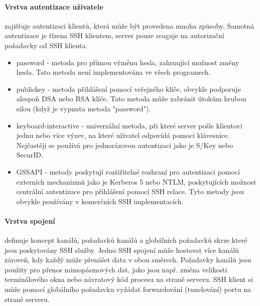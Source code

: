 \documentclass[10pt,a4paper]{article}
\begin{document}
\paragraph{Vrstva autentizace uživatele} zajišťuje autentizaci klientů, která může být provedena mnoha způsoby. Samotná autentizace je řízena SSH klientem, server pouze reaguje na autorizační požadavky od SSH klienta.
\begin{itemize}
	\item password - metoda pro přímou výměnu hesla, zahrnující možnost změny hesla. Tato metoda není implementována ve všech programech.
	\item publickey - metoda přihlášení pomocí veřejného klíče, obvykle podporuje alespoň DSA nebo RSA klíče. Tato metoda může zabránit útokům hrubou silou (když je vypnuta metoda "password").
	\item keyboard-interactive - univerzální metoda, při které server pošle klientovi jednu nebo více výzev, na které uživatel odpovídá pomocí klávesnice. Nejčastěji se používá pro jednorázovou autentizaci jako je S/Key nebo SecurID.
	\item GSSAPI - metody poskytují rozšiřitelné rozhraní pro autentizaci pomocí externích mechanizmů jako je Kerberos 5 nebo NTLM, poskytujících možnost centrální autentizace pro přihlášení pomocí SSH relace. Tyto metody jsou obvykle používány v komerčních SSH implementacích.
\end{itemize}
\paragraph{Vrstva spojení} definuje koncept kanálů, požadavků kanálů a globálních požadavků skrze které jsou poskytovány SSH služby. Jedno SSH spojení může hostovat více kanálů zároveň, kdy každý může přenášet data v obou směrech. Požadavky kanálů jsou použity pro přenos mimopásmových dat, jako jsou např. změna velikosti terminálového okna nebo návratový kód procesu na straně serveru. SSH klient si může pomocí globálního požadavku vyžádat forwardování (tunelování) portu na straně serveru.
\end{document}
